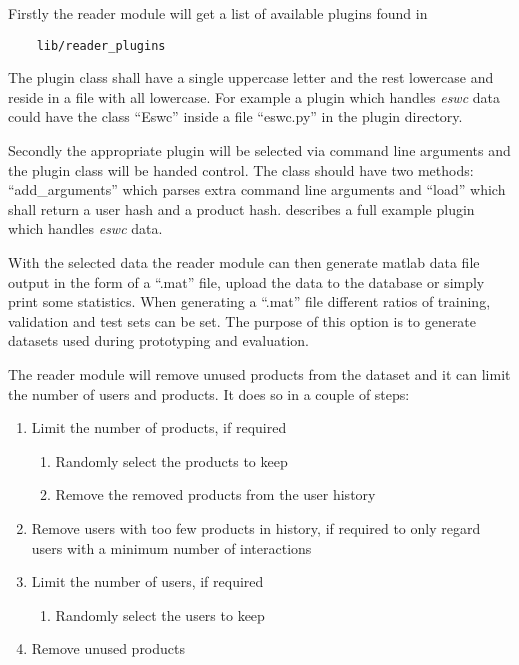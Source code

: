 Firstly the reader module will get a list of available plugins found in

\begin{lstlisting}
    lib/reader_plugins
\end{lstlisting}

The plugin class shall have a single uppercase letter and the rest lowercase and reside in a file with all lowercase. For example a plugin which handles \textit{eswc} data could have the class ``Eswc'' inside a file ``eswc.py'' in the plugin directory.

Secondly the appropriate plugin will be selected via command line arguments and the plugin class will be handed control. The class should have two methods: ``add\_arguments'' which parses extra command line arguments and ``load'' which shall return a user hash and a product hash.  describes a full example plugin which handles \textit{eswc} data.

With the selected data the reader module can then generate matlab data file output in the form of a ``.mat'' file, upload the data to the database or simply print some statistics. When generating a ``.mat'' file different ratios of training, validation and test sets can be set. The purpose of this option is to generate datasets used during prototyping and evaluation.

The reader module will remove unused products from the dataset and it can limit the number of users and products. It does so in a couple of steps:

\begin{enumerate}
    \item Limit the number of products, if required
        \begin{enumerate}
            \item Randomly select the products to keep
            \item Remove the removed products from the user history
        \end{enumerate}
    \item Remove users with too few products in history, if required to only regard users with a minimum number of interactions
    \item Limit the number of users, if required
        \begin{enumerate}
            \item Randomly select the users to keep
        \end{enumerate}
    \item Remove unused products
\end{enumerate}



